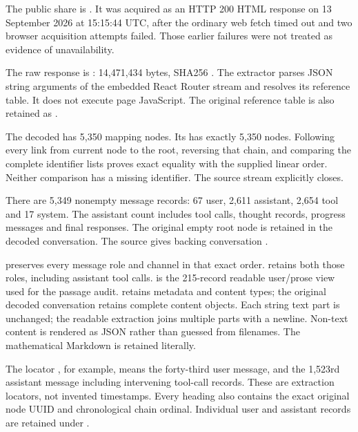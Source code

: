 \documentclass[10pt,a4paper,oneside]{report}
\begin{document}
The public share is
\href{https://chatgpt.com/share/6aa6bc6e-98cc-83eb-9343-e811c26d6631}{\protect{}}.
It was acquired as an HTTP 200 HTML response on 13 September 2026 at
15:15:44 UTC, after the ordinary web fetch timed out and two browser
acquisition attempts failed. Those earlier failures were not treated as
evidence of unavailability.

The raw response is \protect{}: 14,471,434 bytes,
SHA256
\protect{}.
The extractor parses JSON string arguments of the embedded React Router
stream and resolves its reference table. It does not execute page
JavaScript. The original reference table is also retained as
\protect{}.

The decoded \protect{} has 5,350 mapping
nodes. Its \protect{} has exactly 5,350 nodes.
Following every \protect{} link from current node
\protect{} to the root,
reversing that chain, and comparing the complete identifier lists proves
exact equality with the supplied linear order. Neither comparison has a
missing identifier. The source stream explicitly closes.

There are 5,349 nonempty message records: 67 user, 2,611 assistant,
2,654 tool and 17 system. The assistant count includes tool calls,
thought records, progress messages and final responses. The original
empty root node is retained in the decoded conversation. The source
gives backing conversation
\protect{}.

\protect{} preserves every message role and
channel in that exact order. \protect{}
retains both those roles, including assistant tool calls.
\protect{} is the 215-record readable
user/prose view used for the passage audit.
\protect{} retains metadata and content
types; the original decoded conversation retains complete content
objects. Each string text part is unchanged; the readable extraction
joins multiple parts with a newline. Non-text content is rendered as
JSON rather than guessed from filenames. The mathematical Markdown is
retained literally.

The locator \protect{}, for example, means the forty-third
user message, and \protect{} the 1,523rd assistant message
including intervening tool-call records. These are extraction locators,
not invented timestamps. Every heading also contains the exact original
node UUID and chronological chain ordinal. Individual user and assistant
records are retained under \protect{}.
\end{document}

